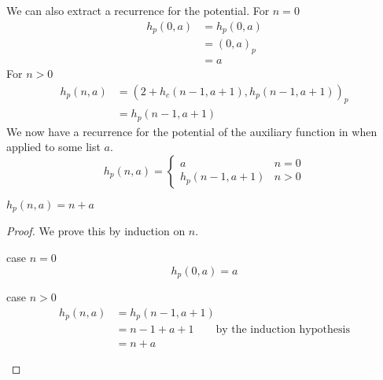 We can also extract a recurrence for the potential.
For $n=0$
%
\begin{align*}
h_p(0,a) &= h_p(0,a) \\
         &= (0, a)_p \\
         &= a
\end{align*}
%
For $n>0$
%
\begin{align*}
  h_p(n,a) &= (2 + h_c(n-1,a+1), h_p(n-1,a+1))_p \\
           &= h_p(n-1,a+1)
\end{align*}
%
We now have a recurrence for the potential of the auxiliary function in
 when applied to some list $a$.
%
\begin{equation}
  h_p(n,a) = \begin{cases}
    a & n = 0 \\
    h_p(n-1,a+1) & n > 0
  \end{cases}
\end{equation}
%
\begin{theorem}
  \label{lem:fr_interp_h_potential}
  $h_p(n,a) = n + a$
\end{theorem}
%
\begin{proof}
  We prove this by induction on $n$.
  \begin{description}
    \item{case $n=0$}\hfill \\
      \[ h_p(0,a) = a \]
    \item{case $n>0$}\hfill \\
      \begin{align*}
      h_p(n,a) &= h_p(n-1,a+1) \\
               &= n - 1 + a + 1  \qquad \text{by the induction hypothesis} \\
               &= n + a
      \end{align*}
  \end{description}
\end{proof}
%



